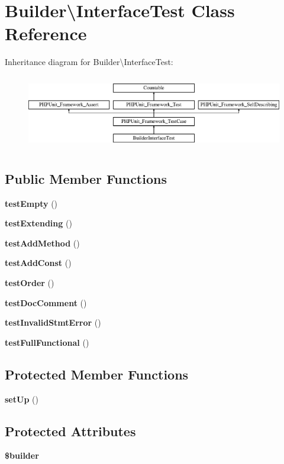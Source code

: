 \section{Builder\textbackslash{}Interface\+Test Class Reference}
\label{class_php_parser_1_1_builder_1_1_interface_test}
Inheritance diagram for Builder\textbackslash{}Interface\+Test\+:\begin{figure}[H]
\begin{center}
\leavevmode
\includegraphics[height=3.303835cm]{class_php_parser_1_1_builder_1_1_interface_test}
\end{center}
\end{figure}
\subsection*{Public Member Functions}
\begin{DoxyCompactItemize}
\item 
{\bf test\+Empty} ()
\item 
{\bf test\+Extending} ()
\item 
{\bf test\+Add\+Method} ()
\item 
{\bf test\+Add\+Const} ()
\item 
{\bf test\+Order} ()
\item 
{\bf test\+Doc\+Comment} ()
\item 
{\bf test\+Invalid\+Stmt\+Error} ()
\item 
{\bf test\+Full\+Functional} ()
\end{DoxyCompactItemize}
\subsection*{Protected Member Functions}
\begin{DoxyCompactItemize}
\item 
{\bf set\+Up} ()
\end{DoxyCompactItemize}
\subsection*{Protected Attributes}
\begin{DoxyCompactItemize}
\item 
{\bf \$builder}
\end{DoxyCompactItemize}
